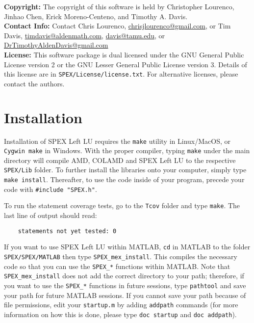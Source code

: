 \documentclass[12pt]{report}
\theoremstyle{definition}
\begin{document}
\textbf{Copyright:} The copyright of this software is held by  Christopher Lourenco, Jinhao Chen, Erick Moreno-Centeno, and Timothy A. Davis.\\

\noindent \textbf{Contact Info:} Contact Chris Lourenco,
\href{mailto:chrisjlourenco@gmail.com}{chrisjlourenco@gmail.com}, or Tim Davis,
\href{mailto:timdavis@aldenmath.com}{timdavis@aldenmath.com},
\href{mailto:davis@tamu.edu}{davis@tamu.edu}, or
\href{DrTimothyAldenDavis@gmail.com}{DrTimothyAldenDavis@gmail.com}\\

\noindent \textbf{License:} This software package is dual licensed under the GNU General Public License version 2 or the GNU Lesser General Public License version 3. Details of this license are in \verb|SPEX/License/license.txt|. For alternative licenses, please contact the authors.


\section{Installation} \label{s:install}

Installation of SPEX Left LU requires the \verb|make| utility in Linux/MacOS, or
\verb|Cygwin make| in Windows. With the proper compiler, typing \verb|make|
under the main directory will compile AMD, COLAMD and SPEX Left LU to the respective
\verb|SPEX/Lib| folder. To further install the libraries onto your computer,
simply type \verb|make install|.  Thereafter, to use the code inside of your
program, precede your code with \newline \verb|#include "SPEX.h"|.

To run the statement coverage tests, go to the \verb|Tcov| folder and
type \verb|make|.  The last line of output should read:

\begin{verbatim}
    statements not yet tested: 0
\end{verbatim}

If you want to use SPEX Left LU within MATLAB, 
\verb|cd| in MATLAB to the folder \verb|SPEX/SPEX/MATLAB| then type
\newline \verb|SPEX_mex_install|. This compiles the necessary code so that you can use
the \verb|SPEX_*| functions within MATLAB. Note that
\newline \verb|SPEX_mex_install| does not add the correct directory to your path; therefore,
if you want to use the \verb|SPEX_*| functions in future sessions, type
\verb|pathtool| and save your path for future MATLAB sessions. If you cannot
save your path because of file permissions, edit your \verb|startup.m| by
adding \verb|addpath| commands (for more information on how this is done, please type \verb|doc startup| and \verb|doc addpath|).
\end{document}
